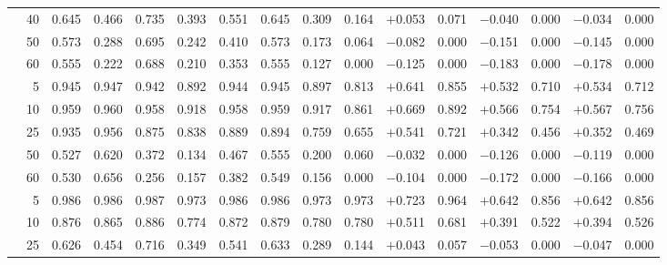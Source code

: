 \documentclass[conference]{IEEEtran}
\theoremstyle{remark}
\begin{document}
\begin{table}[t]
{\begin{tabular}{p{2.2cm}r rrrr rr rr rr rr rr}
  & 40 & 0.645 & 0.466 & 0.735 & 0.393 & 0.551 & 0.645 & 0.309 & 0.164 & $+$0.053 & 0.071 & $-$0.040 & 0.000 & $-$0.034 & 0.000 \\
  & 50 & 0.573 & 0.288 & 0.695 & 0.242 & 0.410 & 0.573 & 0.173 & 0.064 & $-$0.082 & 0.000 & $-$0.151 & 0.000 & $-$0.145 & 0.000 \\
  & 60 & 0.555 & 0.222 & 0.688 & 0.210 & 0.353 & 0.555 & 0.127 & 0.000 & $-$0.125 & 0.000 & $-$0.183 & 0.000 & $-$0.178 & 0.000 \\
\midrule
{}
  & 5  & 0.945 & 0.947 & 0.942 & 0.892 & 0.944 & 0.945 & 0.897 & 0.813 & $+$0.641 & 0.855 & $+$0.532 & 0.710 & $+$0.534 & 0.712 \\
  & 10 & 0.959 & 0.960 & 0.958 & 0.918 & 0.958 & 0.959 & 0.917 & 0.861 & $+$0.669 & 0.892 & $+$0.566 & 0.754 & $+$0.567 & 0.756 \\
  & 25 & 0.935 & 0.956 & 0.875 & 0.838 & 0.889 & 0.894 & 0.759 & 0.655 & $+$0.541 & 0.721 & $+$0.342 & 0.456 & $+$0.352 & 0.469 \\
  & 50 & 0.527 & 0.620 & 0.372 & 0.134 & 0.467 & 0.555 & 0.200 & 0.060 & $-$0.032 & 0.000 & $-$0.126 & 0.000 & $-$0.119 & 0.000 \\
  & 60 & 0.530 & 0.656 & 0.256 & 0.157 & 0.382 & 0.549 & 0.156 & 0.000 & $-$0.104 & 0.000 & $-$0.172 & 0.000 & $-$0.166 & 0.000 \\
\midrule
{}
  & 5  & 0.986 & 0.986 & 0.987 & 0.973 & 0.986 & 0.986 & 0.973 & 0.973 & $+$0.723 & 0.964 & $+$0.642 & 0.856 & $+$0.642 & 0.856 \\
  & 10 & 0.876 & 0.865 & 0.886 & 0.774 & 0.872 & 0.879 & 0.780 & 0.780 & $+$0.511 & 0.681 & $+$0.391 & 0.522 & $+$0.394 & 0.526 \\
  & 25 & 0.626 & 0.454 & 0.716 & 0.349 & 0.541 & 0.633 & 0.289 & 0.144 & $+$0.043 & 0.057 & $-$0.053 & 0.000 & $-$0.047 & 0.000 \\

\end{tabular}}
\end{table}
\end{document}
